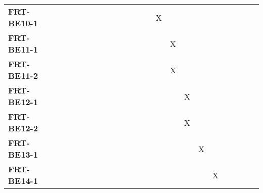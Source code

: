\documentclass[12pt, titlepage]{article}
\begin{document}
\begin{landscape}
\begin{longtable}{|l|ccccccccccccccccc|}
		\textbf{FRT-BE10-1} & ~                                                         & ~            & ~            & ~            & ~            & ~            & ~            & ~            & ~            & X             & ~             & ~             & ~             & ~             & ~             & ~             & ~             \\
		\textbf{FRT-BE11-1} & ~                                                         & ~            & ~            & ~            & ~            & ~            & ~            & ~            & ~            & ~             & X             & ~             & ~             & ~             & ~             & ~             & ~             \\
		\textbf{FRT-BE11-2} & ~                                                         & ~            & ~            & ~            & ~            & ~            & ~            & ~            & ~            & ~             & X             & ~             & ~             & ~             & ~             & ~             & ~             \\
		\textbf{FRT-BE12-1} & ~                                                         & ~            & ~            & ~            & ~            & ~            & ~            & ~            & ~            & ~             & ~             & X             & ~             & ~             & ~             & ~             & ~             \\
		\textbf{FRT-BE12-2} & ~                                                         & ~            & ~            & ~            & ~            & ~            & ~            & ~            & ~            & ~             & ~             & X             & ~             & ~             & ~             & ~             & ~             \\
		\textbf{FRT-BE13-1} & ~                                                         & ~            & ~            & ~            & ~            & ~            & ~            & ~            & ~            & ~             & ~             & ~             & X             & ~             & ~             & ~             & ~             \\
		\textbf{FRT-BE14-1} & ~                                                         & ~            & ~            & ~            & ~            & ~            & ~            & ~            & ~            & ~             & ~             & ~             & ~             & X             & ~             & ~             & ~             \\

\end{longtable}
\end{landscape}
\end{document}
